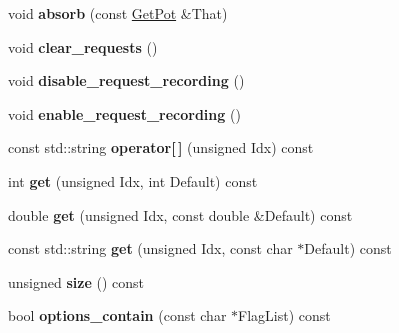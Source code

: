 \begin{DoxyCompactItemize}
\item 
\hypertarget{classGetPot_a57b2855086d47efa2e32cb626d1d21c9}{
void {\bfseries absorb} (const \hyperlink{classGetPot}{GetPot} \&That)}
\label{classGetPot_a57b2855086d47efa2e32cb626d1d21c9}

\item 
\hypertarget{classGetPot_acb2c8d28c7483627cc6875bf149cf8aa}{
void {\bfseries clear\_\-requests} ()}
\label{classGetPot_acb2c8d28c7483627cc6875bf149cf8aa}

\item 
\hypertarget{classGetPot_afdadd023da7b4d13ab41e15845e6bec0}{
void {\bfseries disable\_\-request\_\-recording} ()}
\label{classGetPot_afdadd023da7b4d13ab41e15845e6bec0}

\item 
\hypertarget{classGetPot_a5163b19865018750f4f3452744da2cd8}{
void {\bfseries enable\_\-request\_\-recording} ()}
\label{classGetPot_a5163b19865018750f4f3452744da2cd8}

\item 
\hypertarget{classGetPot_a4fdfa726da0722a03d9bb2fed4aab47a}{
const std::string {\bfseries operator\mbox{[}$\,$\mbox{]}} (unsigned Idx) const }
\label{classGetPot_a4fdfa726da0722a03d9bb2fed4aab47a}

\item 
\hypertarget{classGetPot_a1c017e282a0074f949ea4b6aa7bae6b6}{
int {\bfseries get} (unsigned Idx, int Default) const }
\label{classGetPot_a1c017e282a0074f949ea4b6aa7bae6b6}

\item 
\hypertarget{classGetPot_abb786eaf8984494fa8043cbd4a952407}{
double {\bfseries get} (unsigned Idx, const double \&Default) const }
\label{classGetPot_abb786eaf8984494fa8043cbd4a952407}

\item 
\hypertarget{classGetPot_a432360a5cb32d189e3364c09d41306ca}{
const std::string {\bfseries get} (unsigned Idx, const char $\ast$Default) const }
\label{classGetPot_a432360a5cb32d189e3364c09d41306ca}

\item 
\hypertarget{classGetPot_a2d932ac1adaa8c96cd7d6a9379bee729}{
unsigned {\bfseries size} () const }
\label{classGetPot_a2d932ac1adaa8c96cd7d6a9379bee729}

\item 
\hypertarget{classGetPot_ae0ca20c8e8ddd2908d8d47e0a2d0569b}{
bool {\bfseries options\_\-contain} (const char $\ast$FlagList) const }
\label{classGetPot_ae0ca20c8e8ddd2908d8d47e0a2d0569b}


\end{DoxyCompactItemize}
